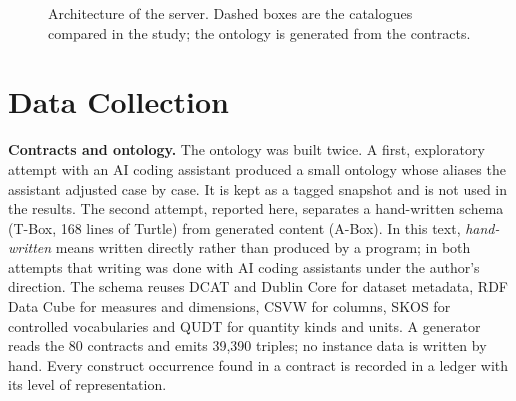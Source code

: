 \begin{figure}[ht]
\centering
{}
\caption{Architecture of the server. Dashed boxes are the catalogues compared in the study;
the ontology is generated from the contracts.}
\label{fig:architecture}
\end{figure}

\section{Data Collection}
\textbf{Contracts and ontology.} The ontology was built twice. A first, exploratory attempt
with an AI coding assistant produced a small ontology whose aliases the assistant adjusted
case by case. It is kept as a tagged snapshot and is not used in the results. The second
attempt, reported here, separates a hand-written schema (T-Box, 168 lines of Turtle) from
generated content (A-Box). In this text, \emph{hand-written} means written directly rather
than produced by a program; in both attempts that writing was done with AI coding assistants
under the author's direction.
The schema reuses DCAT and Dublin Core for dataset metadata, RDF Data Cube for measures and
dimensions, CSVW for columns, SKOS for controlled vocabularies and QUDT for quantity kinds
and units. A generator reads the 80 contracts and emits 39{,}390 triples; no instance data
is written by hand. Every construct occurrence found in a contract is recorded in a ledger
with its level of representation.

